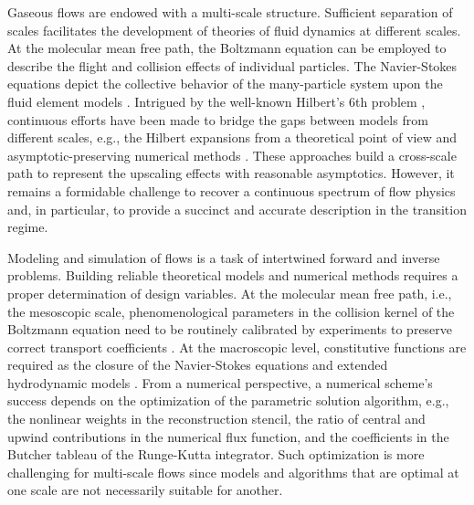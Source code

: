 \documentclass[preprint,3p,12pt,sort&compress]{elsarticle}
\begin{document}
Gaseous flows are endowed with a multi-scale structure.
Sufficient separation of scales facilitates the development of theories of fluid dynamics at different scales.
At the molecular mean free path, the Boltzmann equation can be employed to describe the flight and collision effects of individual particles. 
The Navier-Stokes equations depict the collective behavior of the many-particle system upon the fluid element models \cite{tsien1946superaerodynamics}.
Intrigued by the well-known Hilbert’s 6th problem \cite{hilbert1902mathematical}, continuous efforts have been made to bridge the gaps between models from different scales, e.g., the Hilbert expansions from a theoretical point of view \cite{sone2002kinetic} and asymptotic-preserving numerical methods \cite{jin2022asymptotic}. 
These approaches build a cross-scale path to represent the upscaling effects with reasonable asymptotics.
However, it remains a formidable challenge to recover a continuous spectrum of flow physics and, in particular, to provide a succinct and accurate description in the transition regime.

Modeling and simulation of flows is a task of intertwined forward and inverse problems.
Building reliable theoretical models and numerical methods requires a proper determination of design variables.
At the molecular mean free path, i.e., the mesoscopic scale, phenomenological parameters in the collision kernel of the Boltzmann equation need to be routinely calibrated by experiments to preserve correct transport coefficients \cite{cercignani1988boltzmann}.
At the macroscopic level, constitutive functions are required as the closure of the Navier-Stokes equations and extended hydrodynamic models \cite{rosenau1989extending}.
From a numerical perspective, a numerical scheme's success depends on the optimization of the parametric solution algorithm, e.g., the nonlinear weights in the reconstruction stencil, the ratio of central and upwind contributions in the numerical flux function, and the coefficients in the Butcher tableau of the Runge-Kutta integrator.
Such optimization is more challenging for multi-scale flows since models and algorithms that are optimal at one scale are not necessarily suitable for another.
\end{document}
